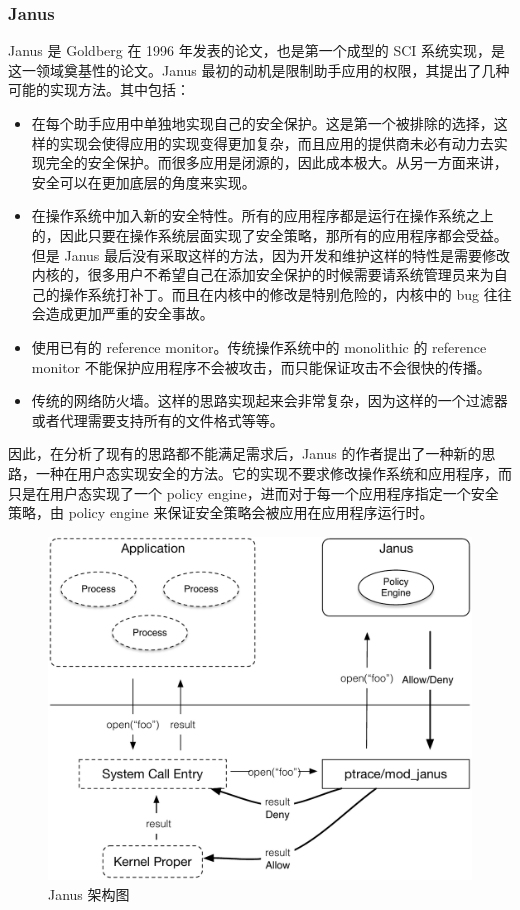 \documentclass[final,5p,times]{elsarticle}
\begin{document}
\subsubsection{Janus}
\label{sss:janus}

Janus \cite{goldberg} 是 Goldberg 在 1996 年发表的论文，也是第一个成型的 SCI 系统实现，是这一领域奠基性的论文。Janus 最初的动机是限制助手应用的权限，其提出了几种可能的实现方法。其中包括：

\begin{itemize}
\item
在每个助手应用中单独地实现自己的安全保护。这是第一个被排除的选择，这样的实现会使得应用的实现变得更加复杂，而且应用的提供商未必有动力去实现完全的安全保护。而很多应用是闭源的，因此成本极大。从另一方面来讲，安全可以在更加底层的角度来实现。
\item
在操作系统中加入新的安全特性。所有的应用程序都是运行在操作系统之上的，因此只要在操作系统层面实现了安全策略，那所有的应用程序都会受益。但是 Janus 最后没有采取这样的方法，因为开发和维护这样的特性是需要修改内核的，很多用户不希望自己在添加安全保护的时候需要请系统管理员来为自己的操作系统打补丁。而且在内核中的修改是特别危险的，内核中的 bug 往往会造成更加严重的安全事故。
\item
使用已有的 reference monitor。传统操作系统中的 monolithic 的 reference monitor 不能保护应用程序不会被攻击，而只能保证攻击不会很快的传播。
\item
传统的网络防火墙。这样的思路实现起来会非常复杂，因为这样的一个过滤器或者代理需要支持所有的文件格式等等。
\end{itemize}

因此，在分析了现有的思路都不能满足需求后，Janus 的作者提出了一种新的思路，一种在用户态实现安全的方法。它的实现不要求修改操作系统和应用程序，而只是在用户态实现了一个 policy engine，进而对于每一个应用程序指定一个安全策略，由 policy engine 来保证安全策略会被应用在应用程序运行时。

\begin{figure}
\centering
\includegraphics[width=0.7\linewidth]{imgs/janus}
\caption{Janus 架构图}
\label{fig:janus}
\end{figure}
\end{document}
